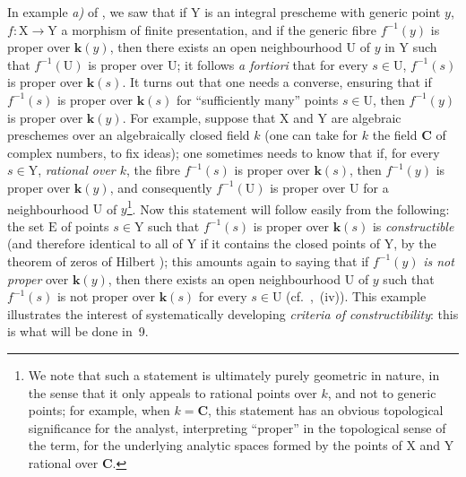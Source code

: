 \begin{env}[8.1.3]
\label{IV.8.1.3}
In example \emph{a)} of , we saw that if $\mathrm{Y}$ is an integral prescheme with generic point $y$, $f:\mathrm{X}\to\mathrm{Y}$ a morphism of finite presentation, and if the generic fibre $f^{-1}(y)$ is proper over $\boldsymbol{k}(y)$, then there exists an open neighbourhood $\mathrm{U}$ of $y$ in $\mathrm{Y}$ such that $f^{-1}(\mathrm{U})$ is proper over $\mathrm{U}$; it follows \emph{a fortiori} that for every $s\in\mathrm{U}$, $f^{-1}(s)$ is proper over $\boldsymbol{k}(s)$.
It turns out that one needs a converse, ensuring that if $f^{-1}(s)$ is proper over $\boldsymbol{k}(s)$ for ``sufficiently many'' points $s\in\mathrm{U}$, then $f^{-1}(y)$ is proper over $\boldsymbol{k}(y)$.
For example, suppose that $\mathrm{X}$ and $\mathrm{Y}$ are algebraic preschemes over an algebraically closed field $k$ (one can take for $k$ the field $\mathbf{C}$ of complex numbers, to fix ideas); one sometimes needs to know that if, for every $s\in\mathrm{Y}$, \emph{rational over $k$}, the fibre $f^{-1}(s)$ is proper over $\boldsymbol{k}(s)$, then $f^{-1}(y)$ is proper over $\boldsymbol{k}(y)$, and consequently $f^{-1}(\mathrm{U})$ is proper over $\mathrm{U}$ for a neighbourhood $\mathrm{U}$ of $y$\footnote{We note that such a statement is ultimately purely geometric in nature, in the sense that it only appeals to rational points over $k$, and not to generic points; for example, when $k=\mathbf{C}$, this statement has an obvious topological significance for the analyst, interpreting ``proper'' in the topological sense of the term, for the underlying analytic spaces formed by the points of $\mathrm{X}$ and $\mathrm{Y}$ rational over $\mathbf{C}$.}.
Now this statement will follow easily from the following: the set $\mathrm{E}$ of points $s\in\mathrm{Y}$ such that $f^{-1}(s)$ is proper over $\boldsymbol{k}(s)$ is \emph{constructible} (and therefore identical to all of $\mathrm{Y}$ if it contains the closed points of $\mathrm{Y}$, by the theorem of zeros of Hilbert ); this amounts again to saying that if $f^{-1}(y)$ \emph{is not proper} over $\boldsymbol{k}(y)$, then there exists an open neighbourhood $\mathrm{U}$ of $y$ such that $f^{-1}(s)$ is not proper over $\boldsymbol{k}(s)$ for every $s\in\mathrm{U}$ (cf.\ ,~(iv)).
This example illustrates the interest of systematically developing \emph{criteria of constructibility}: this is what will be done in \textsection\,9.
\end{env}

